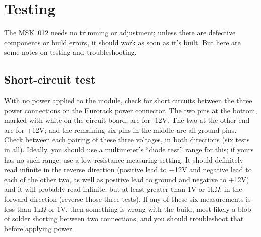 
%
%
%
%
%
%
\chapter{Testing}

The MSK~012 needs no trimming or adjustment; unless there are defective
components or build errors, it should work as soon as it's built.  But here
are some notes on testing and troubleshooting.

\section{Short-circuit test}

With no power applied to the module, check for short circuits between the
three power connections on the Eurorack power connector.  The two pins at
the bottom, marked with white on the circuit board, are for -12V.  The two
at the other end are for +12V; and the remaining six pins in the middle are
all ground pins.  Check between each pairing of these three voltages, in
both directions (six tests in all).  Ideally, you should use a multimeter's
``diode test'' range for this; if yours has no such range, use a low
resistance-measuring setting.  It should definitely read infinite in the
reverse direction (positive lead to $-$12V and negative lead to each of the
other two, as well as positive lead to ground and negative to $+$12V) and it
will probably read infinite, but at least
greater than 1V or 1k$\Omega$, in the forward direction (reverse those three
tests).  If any of these six measurements is less than 1k$\Omega$ or 1V,
then something is wrong with the build, most likely a blob of solder
shorting between two connections, and you should troubleshoot that before
applying power.

